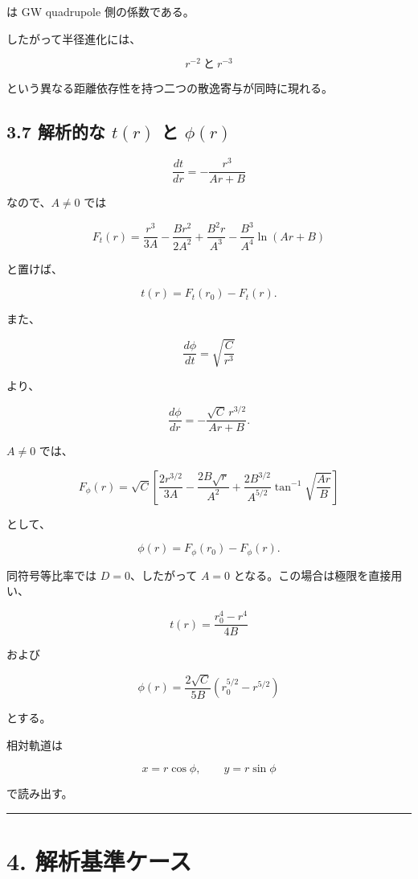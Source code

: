 \documentclass[
  a4paper,
]{ltjsarticle}
\begin{document}
は GW quadrupole 側の係数である。

したがって半径進化には、

\[
\boxed{
r^{-2}\ \text{と}\ r^{-3}
}
\]

という異なる距離依存性を持つ二つの散逸寄与が同時に現れる。

\subsection{\texorpdfstring{3.7 解析的な \(t(r)\) と
\(\phi(r)\)}{3.7 解析的な t(r) と \textbackslash phi(r)}}\label{ux89e3ux6790ux7684ux306a-tr-ux3068-phir}

\[
\frac{dt}{dr}
=-\frac{r^3}{Ar+B}
\]

なので、\(A\ne0\) では

\[
F_t(r)
=
\frac{r^3}{3A}
-\frac{Br^2}{2A^2}
+\frac{B^2r}{A^3}
-\frac{B^3}{A^4}\ln(Ar+B)
\]

と置けば、

\[
\boxed{
t(r)=F_t(r_0)-F_t(r)}.
\]

また、

\[
\frac{d\phi}{dt}=\sqrt{\frac{C}{r^3}}
\]

より、

\[
\frac{d\phi}{dr}
=-\frac{\sqrt C\,r^{3/2}}{Ar+B}.
\]

\(A\ne0\) では、

\[
F_\phi(r)
=
\sqrt C
\left[
\frac{2r^{3/2}}{3A}
-\frac{2B\sqrt r}{A^2}
+\frac{2B^{3/2}}{A^{5/2}}
\tan^{-1}\sqrt{\frac{Ar}{B}}
\right]
\]

として、

\[
\boxed{
\phi(r)=F_\phi(r_0)-F_\phi(r)}.
\]

同符号等比率では \(D=0\)、したがって \(A=0\)
となる。この場合は極限を直接用い、

\[
\boxed{
t(r)=\frac{r_0^4-r^4}{4B}}
\]

および

\[
\boxed{
\phi(r)=\frac{2\sqrt C}{5B}
\left(r_0^{5/2}-r^{5/2}\right)
}
\]

とする。

相対軌道は

\[
\boxed{
x=r\cos\phi,
\qquad
y=r\sin\phi}
\]

で読み出す。

\begin{center}\rule{0.5\linewidth}{0.5pt}\end{center}

\section{4.
解析基準ケース}\label{ux89e3ux6790ux57faux6e96ux30b1ux30fcux30b9}
\end{document}
